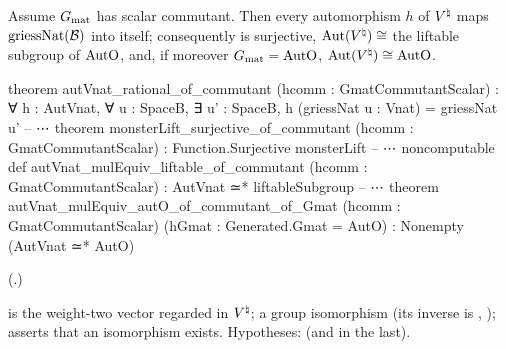 \begin{theorem}\label{ch22:thm:rationalcomm}
Assume $G_{\mathrm{mat}}$ has scalar commutant.  Then every automorphism $h$ of ${V^{\natural}}$ maps
$\mathrm{griessNat}(\mathcal{B})$ into itself; consequently  is surjective, $\operatorname{Aut}({V^{\natural}})\cong$ the
liftable subgroup of $\mathrm{AutO}$, and, if moreover $G_{\mathrm{mat}}=\mathrm{AutO}$, $\operatorname{Aut}({V^{\natural}})\cong\mathrm{AutO}$.
\end{theorem}
\begin{leancode}
theorem autVnat_rational_of_commutant (hcomm : GmatCommutantScalar) :
    ∀ h : AutVnat, ∀ u : SpaceB, ∃ u' : SpaceB, h (griessNat u : Vnat) = griessNat u'
-- ⋯
theorem monsterLift_surjective_of_commutant (hcomm : GmatCommutantScalar) :
    Function.Surjective monsterLift
-- ⋯
noncomputable def autVnat_mulEquiv_liftable_of_commutant (hcomm : GmatCommutantScalar) :
    AutVnat ≃* liftableSubgroup
-- ⋯
theorem autVnat_mulEquiv_autO_of_commutant_of_Gmat (hcomm : GmatCommutantScalar)
    (hGmat : Generated.Gmat = AutO) : Nonempty (AutVnat ≃* AutO)
\end{leancode}
(.)
\begin{dictionary}
 is the weight-two vector regarded in ${V^{\natural}}$;  a group
isomorphism (its inverse is , );
 asserts that an isomorphism exists.  Hypotheses:  (and  in the last).
\end{dictionary}
